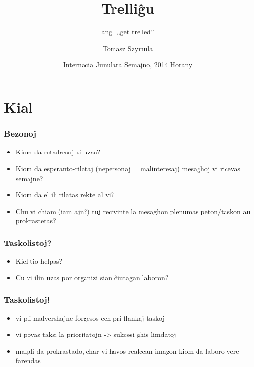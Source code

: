 \documentclass{beamer}
\title{Trelliĝu}
\subtitle{ang. ,,get trelled''}
\author{Tomasz Szymula}
\institute[PEJ]{Pola Esperanto-Junularo}
\date[IJS 2014]{Internacia Junulara Semajno, 2014 Horany}
\begin{document}
  \frame{\titlepage}


  
  \section{Kial}
   
  \begin{frame}
    \frametitle{Bezonoj}
    
    \begin{itemize}
    	\item Kiom da retadresoj vi uzas?
    	\item Kiom da esperanto-rilataj (nepersonaj = malinteresaj) mesaghoj vi ricevas semajne?
    	\item Kiom da el ili rilatas rekte al vi?
    	\item Chu vi chiam (iam ajn?) tuj recivinte la mesaghon plenumas peton/taskon au prokrastetas?
    \end{itemize}
  \end{frame}
   
   
   
  \begin{frame}
    \frametitle{Taskolistoj?}
    
    \begin{itemize}
    	\item Kiel tio helpas?
    	\item Ĉu vi ilin uzas por organizi sian ĉiutagan laboron?
    \end{itemize}
  \end{frame}    


   
  \begin{frame}
    \frametitle{Taskolistoj!}
    \begin{itemize}

    	\item vi pli malvershajne forgesos ech pri flankaj taskoj
    	\item vi povas taksi la prioritatojn -> sukcesi ghis limdatoj
      \item malpli da prokrastado, char vi havos realecan imagon kiom da laboro vere farendas
      
    \end{itemize}
  \end{frame}      
\end{document}
